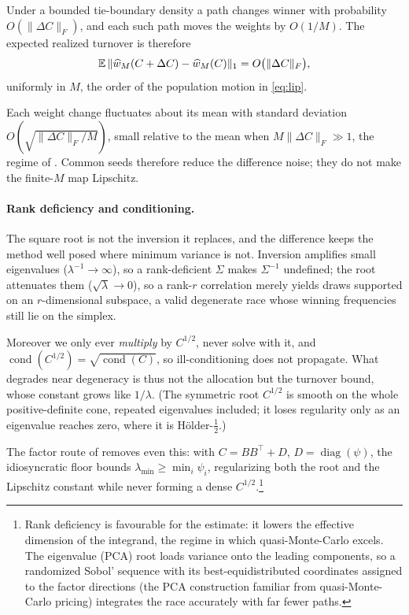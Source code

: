 Under a bounded tie-boundary density a path changes winner with probability
$O(\|\Delta C\|_F)$, and each such path moves the weights by $O(1/M)$. The expected
realized turnover is therefore
\[
  \mathbb{E}\,\|\widehat w_M(C+\Delta C) - \widehat w_M(C)\|_1 = O\big(\|\Delta C\|_F\big),
\]
uniformly in $M$, the order of the population motion in \eqref{eq:lip}.

Each weight change fluctuates about its mean with standard deviation
$O(\sqrt{\|\Delta C\|_F/M})$, small relative to the mean when
$M\|\Delta C\|_F \gg 1$, the regime of . Common seeds therefore
reduce the difference noise; they do not make the finite-$M$ map Lipschitz.

\paragraph{Rank deficiency and conditioning.}
The square root is not the inversion it replaces, and the difference keeps
the method well posed where minimum variance is not.
Inversion amplifies small
eigenvalues ($\lambda^{-1}\to\infty$), so a rank-deficient $\Sigma$ makes
$\Sigma^{-1}$ undefined; the root attenuates them ($\sqrt{\lambda}\to 0$), so a
rank-$r$ correlation merely yields draws supported on an $r$-dimensional subspace,
a valid degenerate race whose winning frequencies still lie on the simplex.

Moreover we only ever \emph{multiply} by $C^{1/2}$, never solve with it, and
$\operatorname{cond}(C^{1/2}) = \sqrt{\operatorname{cond}(C)}$, so ill-conditioning
does not propagate.
What degrades near degeneracy is thus not the allocation but
the turnover bound, whose constant grows like $1/\lambda$.
(The symmetric root
$C^{1/2}$ is smooth on the whole positive-definite cone, repeated eigenvalues
included; it loses regularity only as an eigenvalue reaches zero, where it is
H\"older-$\tfrac12$.)

The factor route of
 removes even this: with
$C = BB^\top + D$, $D = \operatorname{diag}(\psi)$, the idiosyncratic floor bounds
$\lambda_{\min}\ge\min_i\psi_i$, regularizing both the root and the Lipschitz
constant while never forming a dense $C^{1/2}$.\footnote{Rank deficiency is favourable for the estimate: it lowers the effective dimension of the
integrand, the regime in which quasi-Monte-Carlo excels. The eigenvalue (PCA) root
loads variance onto the leading components, so a randomized Sobol' sequence with
its best-equidistributed coordinates assigned to the factor directions (the PCA
construction familiar from quasi-Monte-Carlo pricing) integrates the race
accurately with far fewer paths.}

